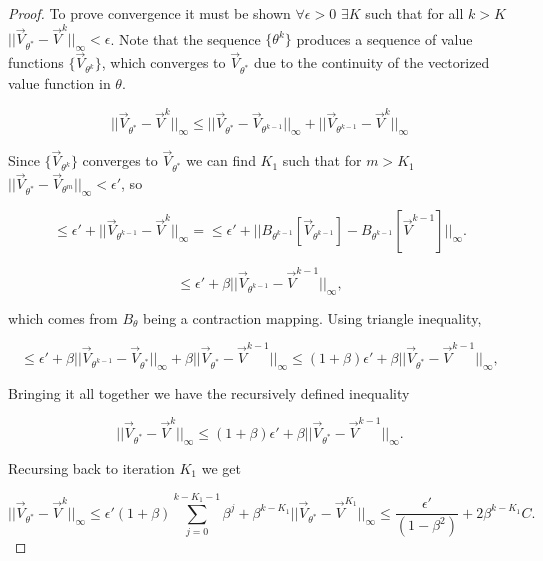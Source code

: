 \documentclass{journal}
\begin{document}
\begin{proof}
To prove convergence it must be shown $\forall \epsilon>0$ $\exists K$ such that for all $k>K$ $||\vec{V}_{\theta^*}-\vec{V}^{k}||_{\infty}< \epsilon$. Note that the sequence $\{\theta^k\}$ produces a sequence of value functions $\{\vec{V}_{\theta^k}\}$, which converges to $\vec{V}_{\theta^*}$ due to the continuity of the vectorized value function in $\theta$.

\begin{equation*}
||\vec{V}_{\theta^*}-\vec{V}^{k}||_{\infty} \leq ||\vec{V}_{\theta^*}-\vec{V}_{\theta^{k-1}}||_{\infty} + ||\vec{V}_{\theta^{k-1}}-\vec{V}^{k}||_{\infty}
\end{equation*}

\noindent Since $\{\vec{V}_{\theta^k}\}$ converges to $\vec{V}_{\theta^*}$ we can find $K_1$ such that for $m>K_1$ $||\vec{V}_{\theta^*}-\vec{V}_{\theta^{m}}||_{\infty} < \epsilon'$, so

\begin{equation*}
\leq \epsilon' + ||\vec{V}_{\theta^{k-1}}-\vec{V}^{k}||_{\infty} = \leq \epsilon' + ||B_{\theta^{k-1}}[\vec{V}_{\theta^{k-1}}]-B_{\theta^{k-1}}[\vec{V}^{k-1}]||_{\infty}.
\end{equation*}

\begin{equation*}
\leq \epsilon' + \beta ||\vec{V}_{\theta^{k-1}}-\vec{V}^{k-1}||_{\infty},
\end{equation*}

\noindent which comes from $B_{\theta}$ being a contraction mapping. Using triangle inequality,

\begin{equation*}
\leq \epsilon' + \beta ||\vec{V}_{\theta^{k-1}}-\vec{V}_{\theta^{*}}||_{\infty} + \beta ||\vec{V}_{\theta^{*}}-\vec{V}^{k-1}||_{\infty} \leq (1+\beta)\epsilon' + \beta ||\vec{V}_{\theta^{*}}-\vec{V}^{k-1}||_{\infty},
\end{equation*}

\noindent Bringing it all together we have the recursively defined inequality

\begin{equation*}
||\vec{V}_{\theta^*}-\vec{V}^{k}||_{\infty}\leq (1+\beta)\epsilon' + \beta ||\vec{V}_{\theta^{*}}-\vec{V}^{k-1}||_{\infty}.
\end{equation*}

\noindent Recursing back to iteration $K_1$ we get 

\begin{equation*}
||\vec{V}_{\theta^*}-\vec{V}^{k}||_{\infty}\leq \epsilon'(1+\beta) \sum_{j=0}^{k-K_1-1} \beta^j + \beta^{k-K_1} ||\vec{V}_{\theta^{*}}-\vec{V}^{K_1}||_{\infty}\leq \frac{\epsilon' }{(1-\beta^2)} + 2\beta^{k-K_1} C .
\end{equation*}


\end{proof}
\end{document}
